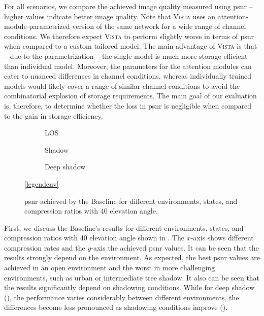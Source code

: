 \documentclass[conference]{IEEEtran}
\newcommand\ours{\textsc{Vista}\xspace}
\newcommand\baseline{Baseline\xspace}
\begin{document}
For all scenarios, we compare the achieved image quality measured using \ac{psnr} -- higher values indicate better image quality.
Note that \ours uses an attention-module-parametrized version of the same network for a wide range of channel conditions.
We therefore expect \ours to perform slightly worse in terms of \ac{psnr} when compared to a custom tailored model.
The main advantage of \ours is that -- due to the parametrization -- the single model is much more storage efficient than individual model.
Moreover, the parameters for the attention modules can cater to nuanced differences in channel conditions, whereas individually trained models would likely cover a range of similar channel conditions to avoid the combinatorial explosion of storage requirements.
The main goal of our evaluation is, therefore, to determine whether the loss in \ac{psnr} is negligible when compared to the gain in storage efficiency.


\begin{figure}[t!]
  \begin{subfigure}{.32\linewidth}
  \centering
  
  \caption{LOS}
  \label{subfig:baseline_los}
\end{subfigure}
\hfill
\begin{subfigure}{.32\linewidth}
  \centering
  
  \caption{Shadow}
  \label{subfig:baseline_shadow}
\end{subfigure}
\hfill
\begin{subfigure}{.32\linewidth}
  \centering
  
  \caption{Deep shadow}
  \label{subfig:baseline_deep_shadow}
\end{subfigure}

\vspace{1em}
\centering
\ref{legendenv}

\caption{\ac{psnr} achieved by the \baseline for different environments, states, and compression ratios with 40\textdegree{} elevation angle.}
\label{fig:different_scenes_40}
\end{figure}

First, we discuss the \baseline's results for different environments, states, and compression ratios with 40\textdegree{} elevation angle shown in . 
The $x$-axis shows different compression rates and the $y$-axis the achieved \ac{psnr} values.
It can be seen that the results strongly depend on the environment.
As expected, the best \ac{psnr} values are achieved in an open environment and the worst in more challenging environments, such as urban or intermediate tree shadow.
It also can be seen that the results significantly depend on shadowing conditions. 
While for deep shadow (), the performance varies considerably between different environments, 
the differences become less pronounced as shadowing conditions improve ().
\end{document}
